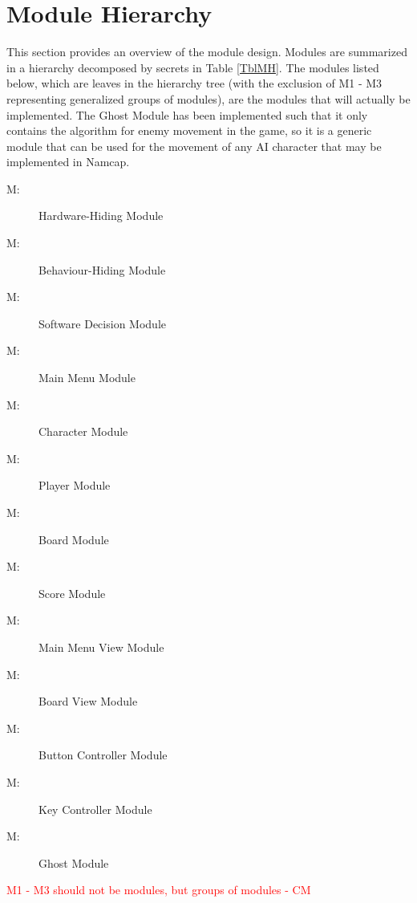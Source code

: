\documentclass[12pt, titlepage]{article}
\newcounter{mnum}
\newcommand{\mthemnum}{M\themnum}
\begin{document}
\section{Module Hierarchy} \label{SecMH}

This section provides an overview of the module design. Modules are summarized
in a hierarchy decomposed by secrets in Table \ref{TblMH}. The modules listed
below, which are leaves in the hierarchy tree (with the exclusion of M1 - M3 representing generalized groups of modules), are the modules that will
actually be implemented. The Ghost Module has been implemented such that it only
contains the algorithm for enemy movement in the game, so it is a generic
module that can be used for the movement of any AI character that may be
implemented in Namcap.

\begin{description}
\item [ \mthemnum \label{mHH}:] Hardware-Hiding Module
\item [ \mthemnum \label{mBH}:] Behaviour-Hiding Module
\item [ \mthemnum \label{mSD}:] Software Decision Module
\item [ \mthemnum \label{mMM}:] Main Menu Module
\item [ \mthemnum \label{mC}:] Character Module
\item [ \mthemnum \label{mP}:] Player Module
\item [ \mthemnum \label{mB}:] Board Module
\item [ \mthemnum \label{mS}:] Score Module
\item [ \mthemnum \label{mMV}:] Main Menu View Module
\item [ \mthemnum \label{mBV}:] Board View Module
\item [ \mthemnum \label{mBC}:] Button Controller Module
\item [ \mthemnum \label{mKC}:] Key Controller Module
\item [ \mthemnum \label{mG}:] Ghost Module
\end{description}
\textcolor{red}{M1 - M3 should not be modules, but groups of modules - CM} \\
\end{document}

